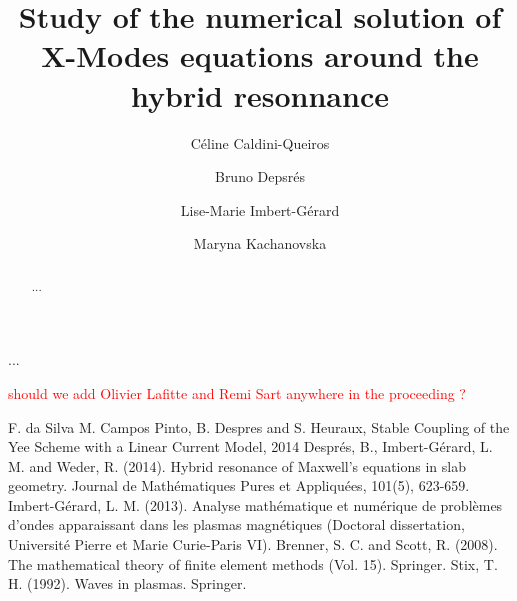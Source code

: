 \documentclass[proc]{edpsmath}
\begin{document}
\title{Study of the
	numerical solution of X-Modes equations around the hybrid resonnance} %
%
\author{C\'eline Caldini-Queiros}\address{Max Planck Institute für PlasmaPhysik, Garching bei Muenchen}
\author{Bruno Depsr\'es}\address{Laboratoire Jacques-Louis Lions, University PARIS 6}
\author{Lise-Marie Imbert-Gérard}\address{Courant Institute of Mathematical Sciences, New York University}
\author{Maryna Kachanovska}\address{POEMS, INRIA, ENSTA ParisTech, Paris}


%
%
\begin{abstract} ... \end{abstract}
%
\begin{resume} ... \end{resume}
%
%
\maketitle
\textcolor{red}{should we add Olivier Lafitte and Remi Sart anywhere in the proceeding ?}\\

%





%
\begin{thebibliography}{99}
 F. da Silva M. Campos Pinto, B. Despres and S. Heuraux, Stable Coupling of the Yee Scheme with a Linear Current Model,
2014
 Després, B., Imbert-Gérard, L. M. and Weder, R. (2014). Hybrid resonance of Maxwell's equations in slab geometry. Journal de Mathématiques Pures et Appliquées, 101(5), 623-659.
 Imbert-Gérard, L. M. (2013). Analyse mathématique et numérique de problèmes d'ondes apparaissant dans les plasmas magnétiques (Doctoral dissertation, Université Pierre et Marie Curie-Paris VI).
 Brenner, S. C. and Scott, R. (2008). The mathematical theory of finite element methods (Vol. 15). Springer.
 Stix, T. H. (1992). Waves in plasmas. Springer.
\end{thebibliography}
\end{document}
